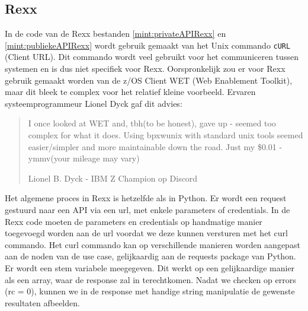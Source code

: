 \subsection{Rexx}
In de code van de Rexx bestanden \ref{mint:privateAPIRexx} en \ref{mint:publiekeAPIRexx} wordt gebruik gemaakt van het Unix commando \texttt{cURL} (Client URL). Dit commando wordt veel gebruikt voor het communiceren tussen systemen en is dus niet specifiek voor Rexx. Oorspronkelijk zou er voor Rexx gebruik gemaakt worden van de z/OS Client WET (Web Enablement Toolkit), maar dit bleek te complex voor het relatief kleine voorbeeld. Ervaren systeemprogrammeur Lionel Dyck gaf dit advies:

\blockquote[Lionel B. Dyck - IBM Z Champion op Discord]{I once looked at WET and, tbh(to be honest), gave up - seemed too complex for what it does.  Using bpxwunix with standard unix tools seemed easier/simpler and more maintainable down the road.  Just my \$0.01 - ymmv(your mileage may vary)}

Het algemene proces in Rexx is hetzelfde als in Python. Er wordt een request gestuurd naar een API via een url, met enkele parameters of credentials. In de Rexx code moeten de parameters en credentials op handmatige manier toegevoegd worden aan de url voordat we deze kunnen versturen met het curl commando. Het curl commando kan op verschillende manieren worden aangepast aan de noden van de use case, gelijkaardig aan de requests package van Python. Er wordt een stem variabele meegegeven. Dit werkt op een gelijkaardige manier als een array, waar de response zal in terechtkomen. Nadat we checken op errors (rc = 0), kunnen we in de response met handige string manipulatie de gewenste resultaten afbeelden.

